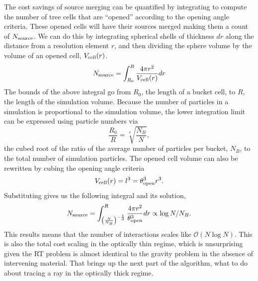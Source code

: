\documentclass[fleq,usenatbib]{mnras}
\newcommand{\bigO}[1]{\mathcal{O}\left(#1\right)}
\newcommand{\NS}{N_{\rm source}}
\newcommand{\tO}{\theta_{\rm open}}
\begin{document}
The cost savings of source merging can be quantified by integrating to compute 
the number of tree cells that are ``opened'' according to the opening angle 
criteria. These opened cells will have their sources merged making them a 
count of $\NS$. We can do this by integrating spherical shells 
of thickness $dr$ along the distance from a resolution element $r$, and then 
dividing the sphere volume by the volume of an opened cell, $V_{\rm cell}(r)$.
\begin{equation}
\label{eqn:nsint}
\NS = \int_{R_0}^R \frac{4\pi r^2}{V_{\rm cell}(r)} dr
\end{equation}
The bounds of the above integral go from $R_0$, the length of a bucket 
cell, to $R$, the length of the simulation volume. Because the number of 
particles in a simulation is proportional to the simulation volume, the 
lower integration limit can be expressed using particle numbers via 
\begin{equation}
\label{eqn:ratio}
\frac{R_0}{R} = \sqrt[3]{\frac{N_B}{N}},
\end{equation} 
the cubed root of the ratio of the average number of particles per bucket, 
$N_B$, to the total number of simulation particles. The opened cell volume can 
also be rewritten by cubing the opening angle criteria
\begin{equation}
\label{eqn:vcell}
V_{\rm cell}(r) = l^3 = \tO^3 r^3.
\end{equation}
Substituting gives us the following integral and its solution,
\begin{equation}
\label{eqn:nssoln}
\NS = \int_{\left(\frac{N}{N_B}\right)^{-\frac{1}{3}}}^R 
\frac{4\pi r^2}{\tO^3} dr
\propto \log{N/N_B}.
\end{equation}
This results means that the number of interactions scales like 
$\bigO{N \log N}$. This is also the total cost scaling in the optically 
thin regime, which is unsurprising given the RT problem is almost identical to 
the gravity problem in the absence of intervening material. That brings up the 
next part of the algorithm, what to do about tracing a ray in the optically 
thick regime.
\end{document}
